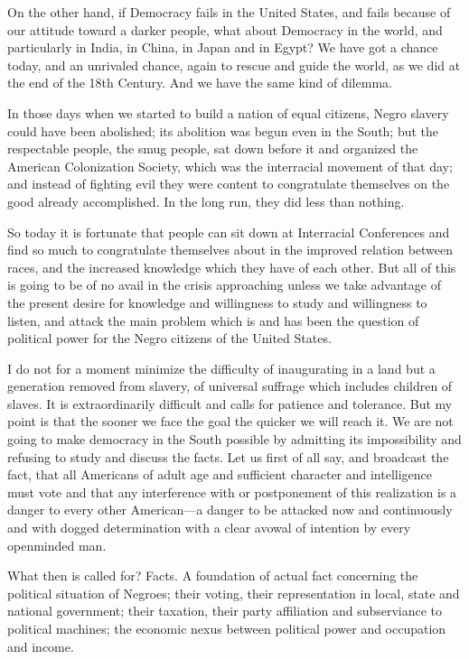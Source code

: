 \documentclass[letterpaper,10pt,english]{jupyterBook}
\begin{document}
\sphinxAtStartPar
On the other hand, if Democracy fails in the United States, and fails because of our attitude toward a darker people, what about Democracy in the world, and particularly in India, in China, in Japan and in Egypt? We have got a chance today, and an unrivaled chance, again to rescue and guide the world, as we did at the end of the 18th Century. And we have the same kind of dilemma.

\sphinxAtStartPar
In those days when we started to build a nation of equal citizens, Negro slavery could have been abolished; its abolition was begun even in the South; but the respectable people, the smug people, sat down before it and organized the American Colonization Society, which was the interracial movement of that day; and instead of fighting evil they were content to congratulate themselves on the good already accomplished. In the long run, they did less than nothing.

\sphinxAtStartPar
So today it is fortunate that people can sit down at Interracial Conferences and find so much to congratulate themselves about in the improved relation between races, and the increased knowledge which they have of each other. But all of this is going to be of no avail in the crisis approaching unless we take advantage of the present desire for knowledge and willingness to study and willingness to listen, and attack the main problem which is and has been the question of political power for the Negro citizens of the United States.

\sphinxAtStartPar
I do not for a moment minimize the difficulty of inaugurating in a land but a generation removed from slavery, of universal suffrage which includes children of slaves. It is extraordinarily difficult and calls for patience and tolerance. But my point is that the sooner we face the goal the quicker we will reach it. We are not going to make democracy in the South possible by admitting its impossibility and refusing to study and discuss the facts. Let us first of all say, and broadcast the fact, that all Americans of adult age and sufficient character and intelligence must vote and that any interference with or postponement of this realization is a danger to every other American—a danger to be attacked now and continuously and with dogged determination with a clear avowal of intention by every open\sphinxhyphen{}minded man.

\sphinxAtStartPar
What then is called for? Facts. A foundation of actual fact concerning the political situation of Negroes; their voting, their representation in local, state and national government; their taxation, their party affiliation and subserviance to political machines; the economic nexus between political power and occupation and income.
\end{document}
